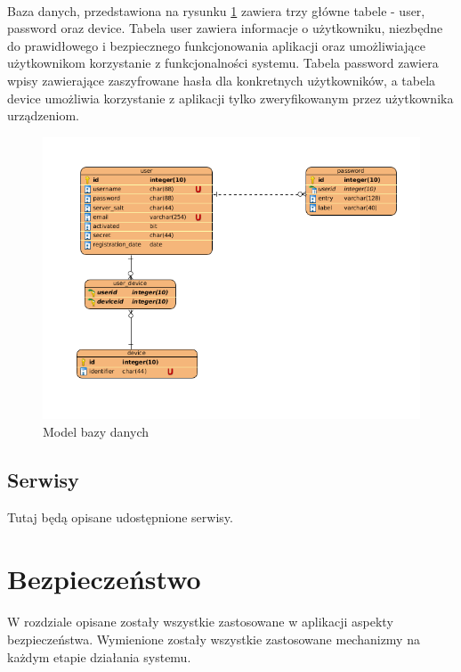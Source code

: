 \documentclass{article}
\begin{document}
    \paragraph{}Baza danych, przedstawiona na rysunku \ref{fig:db} zawiera trzy główne tabele - user, password oraz device. Tabela user zawiera informacje o użytkowniku, niezbędne do prawidłowego i bezpiecznego funkcjonowania aplikacji oraz umożliwiające użytkownikom korzystanie z funkcjonalności systemu. Tabela password zawiera wpisy zawierające zaszyfrowane hasła dla konkretnych użytkowników, a tabela device umożliwia korzystanie z aplikacji tylko zweryfikowanym przez użytkownika urządzeniom.

    \begin{figure}[H]
		\centering
		\includegraphics[width=1\linewidth]{assets/db.png}
		\caption[]{Model bazy danych}
		\label{fig:db}
	\end{figure}

    \subsection{Serwisy}
    Tutaj będą opisane udostępnione serwisy.

    \section{Bezpieczeństwo}
    \paragraph{}W rozdziale opisane zostały wszystkie zastosowane w aplikacji aspekty bezpieczeństwa. Wymienione zostały wszystkie zastosowane mechanizmy na każdym etapie działania systemu.
\end{document}
